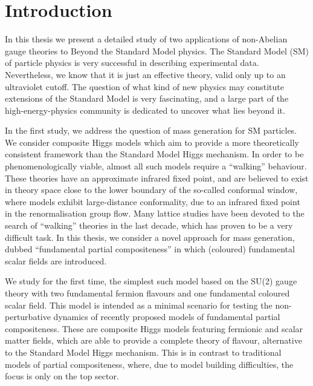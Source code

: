 \chapter{Introduction}

In this thesis we present a detailed study of two applications of non-Abelian gauge theories to Beyond the Standard Model physics.
The Standard Model (SM) of particle physics is very successful in describing experimental data. Nevertheless, we know that it is just an effective theory, valid only up to an ultraviolet cutoff. 
The question of what kind of new physics may constitute extensions of the Standard Model is very fascinating, and a large part of the high-energy-physics community is dedicated to uncover what lies beyond it. 

In the first study, we address the question of mass generation for SM particles. 
We consider composite Higgs models which aim to provide a more theoretically consistent framework than the Standard Model Higgs mechanism. 
In order to be phenomenologically viable, almost all such models require  a ``walking'' behaviour. These theories have an approximate infrared fixed point, and are believed to exist in theory space close to the lower boundary of the so-called conformal window, where models exhibit large-distance conformality, due to an infrared fixed point in the renormalisation group flow. 
Many lattice studies have been devoted to the search of ``walking'' theories in the last decade, which has proven to be a very difficult task.
In this thesis, we consider a novel approach for mass generation, dubbed ``fundamental partial compositeness'' \cite{Sannino:2016sfx} in which (coloured) fundamental scalar fields are introduced.

We study for the first time, the simplest such model based on the SU(2) gauge theory with two fundamental fermion flavours and one fundamental coloured scalar field. This model is intended as a minimal scenario for testing the non-perturbative dynamics of recently proposed models of  fundamental partial compositeness. These are composite Higgs models featuring fermionic and scalar matter fields, which are able to provide a complete theory of flavour, alternative to the Standard Model Higgs mechanism. This is in contrast to traditional models of partial compositeness, where, due to model building difficulties, the focus is only on the top sector.


